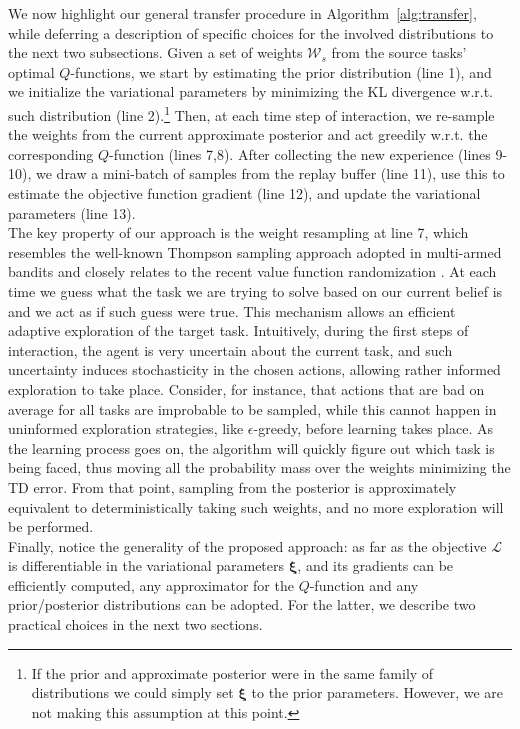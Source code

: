 \documentclass{article}
\begin{document}
We now highlight our general transfer procedure in Algorithm~\ref{alg:transfer}, while deferring a description of specific choices for the involved distributions to the next two subsections. Given a set of weights $\mathcal{W}_s$ from the source tasks' optimal $Q$-functions, we start by estimating the prior distribution (line 1), and we initialize the variational parameters by minimizing the KL divergence w.r.t. such distribution (line 2).\footnote{If the prior and approximate posterior were in the same family of distributions we could simply set $\bm{\xi}$ to the prior parameters. However, we are not making this assumption at this point.} Then, at each time step of interaction, we re-sample the weights from the current approximate posterior and act greedily w.r.t. the corresponding $Q$-function (lines 7,8). After collecting the new experience (lines 9-10), we draw a mini-batch of samples from the replay buffer (line 11), use this to estimate the objective function gradient (line 12), and update the variational parameters (line 13).\\
The key property of our approach is the weight resampling at line 7, which resembles the well-known Thompson sampling approach adopted in multi-armed bandits \cite{bubeck2012regret} and closely relates to the recent value function randomization \cite{osband2014generalization}. At each time we guess what the task we are trying to solve based on our current belief is and we act as if such guess were true. This mechanism allows an efficient adaptive exploration of the target task. Intuitively, during the first steps of interaction, the agent is very uncertain about the current task, and such uncertainty induces stochasticity in the chosen actions, allowing rather informed exploration to take place. Consider, for instance, that actions that are bad on average for all tasks are improbable to be sampled, while this cannot happen in uninformed exploration strategies, like $\epsilon$-greedy, before learning takes place. As the learning process goes on, the algorithm will quickly figure out which task is being faced, thus moving all the probability mass over the weights minimizing the TD error. From that point, sampling from the posterior is approximately equivalent to deterministically taking such weights, and no more exploration will be performed.\\
Finally, notice the generality of the proposed approach: as far as the objective $\mathcal{L}$ is differentiable in the variational parameters $\bm{\xi}$, and its gradients can be efficiently computed, any approximator for the $Q$-function and any prior/posterior distributions can be adopted. For the latter, we describe two practical choices in the next two sections.
\end{document}

